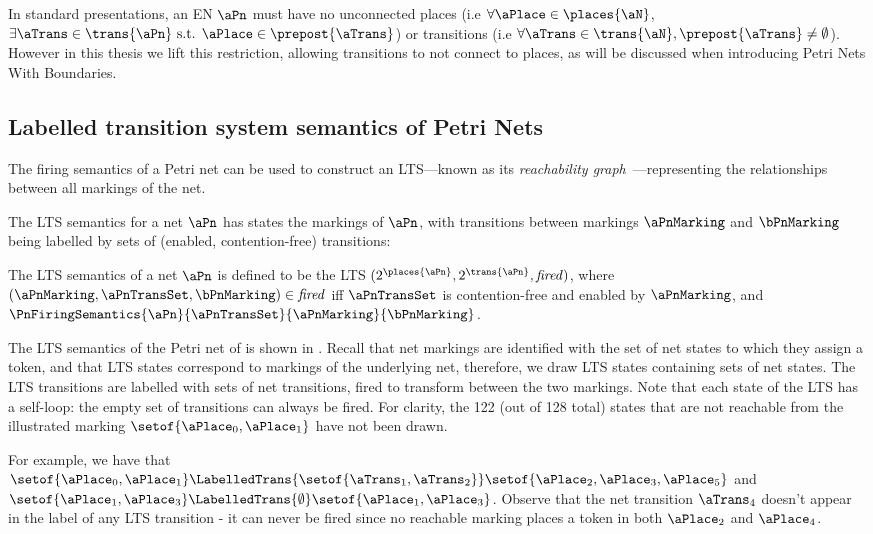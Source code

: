 In standard presentations, an EN $\aPn$ must have no unconnected places (i.e
$\forall \aPlace \in \places{\aN}$, $\exists \aTrans \in\trans{\aPn} \text{ s.t.
} \aPlace \in \prepost{\aTrans}$) or transitions (i.e $\forall \aTrans \in
\trans{\aN}, \prepost{\aTrans} \neq \emptyset$).  However in this thesis we
lift this restriction, allowing transitions to not connect to places, as will
be discussed when introducing Petri Nets With Boundaries.

\subsection{Labelled transition system semantics of Petri
Nets}\label{sec:PNLTSSemantics}

The firing semantics of a Petri net can be used to construct an LTS---known as
its \emph{reachability graph}~\cite{Murata1989}---representing the
relationships between all markings of the net.

The LTS semantics for a net $\aPn$ has states the markings of $\aPn$, with
transitions between markings $\aPnMarking$ and $\bPnMarking$ being labelled by
sets of (enabled, contention-free) transitions:

\begin{definition}
    \newcommand{\firedRel}{\mathit{fired}}
    The LTS semantics of a net $\aPn$ is defined to be the LTS
    $(2^{\places{\aPn}}, 2^{\trans{\aPn}}, \firedRel)$, where $(\aPnMarking,
    \aPnTransSet, \bPnMarking) \in \firedRel$ iff $\aPnTransSet$ is
    contention-free and enabled by $\aPnMarking$, and
    $\PnFiringSemantics{\aPn}{\aPnTransSet}{\aPnMarking}{\bPnMarking}$.
\end{definition}

\begin{example}
The LTS semantics of the Petri net of  is shown in
. Recall that net markings are identified
with the set of net states to which they assign a token, and that LTS states
correspond to markings of the underlying net, therefore, we draw LTS states
containing sets of net states. The LTS transitions are labelled with sets of
net transitions, fired to transform between the two markings. Note that each
state of the LTS has a self-loop: the empty set of transitions can always be
fired. For clarity, the 122 (out of 128 total) states that are not reachable
from the illustrated marking $\setof{\aPlace_0, \aPlace_1}$ have not been
drawn.

For example, we have that
\(\setof{\aPlace_0,\aPlace_1} \LabelledTrans{\setof{\aTrans_1,\aTrans_2}}
\setof{\aPlace_2,\aPlace_3,\aPlace_5} \) and $\setof{\aPlace_1,\aPlace_3} \LabelledTrans{\emptyset}
\setof{\aPlace_1,\aPlace_3}$.  Observe that the net transition $\aTrans_4$ doesn't appear in the
label of any LTS transition - it can never be fired since no reachable marking places a token in
both $\aPlace_2$ and $\aPlace_4$.
\end{example}

